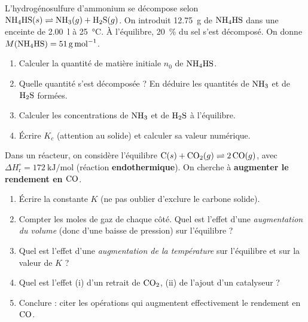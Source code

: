 \documentclass[11pt,a4paper]{article}
\newcommand{\dHr}{\Delta H^{\circ}_{\text{r}}}
\begin{document}
\begin{exercice}
L'hydrogénosulfure d'ammonium se décompose selon
\;$\ce{NH4HS}(s) \rightleftharpoons \ce{NH3}(g) + \ce{H2S}(g)$.\; On introduit \SI{12.75}{\gram} de
$\ce{NH4HS}$ dans une enceinte de \SI{2.00}{\litre} à \SI{25}{\celsius}. À l'équilibre, \SI{20}{\percent}
du sel s'est décomposé. On donne $M(\ce{NH4HS}) = \SI{51}{\gram\per\mol}$.
\begin{enumerate}[label=\alph*),leftmargin=2em,topsep=2pt,itemsep=2pt]
  \item Calculer la quantité de matière initiale $n_0$ de $\ce{NH4HS}$.
  \item Quelle quantité s'est décomposée ? En déduire les quantités de $\ce{NH3}$ et de $\ce{H2S}$ formées.
  \item Calculer les concentrations de $\ce{NH3}$ et de $\ce{H2S}$ à l'équilibre.
  \item Écrire $K_c$ (attention au solide) et calculer sa valeur numérique.
\end{enumerate}
\end{exercice}

\begin{exercice}
Dans un réacteur, on considère l'équilibre \;$\ce{C}(s) + \ce{CO2}(g) \rightleftharpoons 2\,\ce{CO}(g)$,\;
avec $\dHr = \SI{+172}{\kilo\joule\per\mol}$ (réaction \textbf{endothermique}). On cherche à
\textbf{augmenter le rendement en $\ce{CO}$}.
\begin{enumerate}[label=\alph*),leftmargin=2em,topsep=2pt,itemsep=2pt]
  \item Écrire la constante $K$ (ne pas oublier d'exclure le carbone solide).
  \item Compter les moles de gaz de chaque côté. Quel est l'effet d'une \emph{augmentation du volume}
        (donc d'une baisse de pression) sur l'équilibre ?
  \item Quel est l'effet d'une \emph{augmentation de la température} sur l'équilibre et sur la valeur de $K$ ?
  \item Quel est l'effet (i) d'un retrait de $\ce{CO2}$, (ii) de l'ajout d'un catalyseur ?
  \item Conclure : citer les opérations qui augmentent effectivement le rendement en $\ce{CO}$.
\end{enumerate}
\end{exercice}
\end{document}
